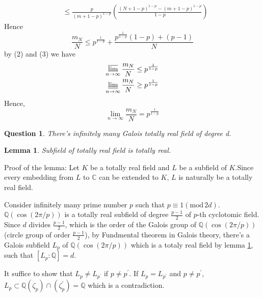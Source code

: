 \documentclass[a4paper,12pt]{article}
\newenvironment{prooff}{{\noindent\it\textcolor{cyan!40!black}{Proof}:}\quad}{\par}
\newcommand{\bb}[1]{\mathbb{#1}}
\newcommand{\p}{^{\prime}}
\renewcommand{\mod}[1]{(\text{mod}\,#1)}
\newtheorem{lem}[defn]{Lemma}
\newtheorem{ques}{Question}
\begin{document}
\begin{prooff}
\begin{align*}
          & \le \frac{p}{(m+1-p)^{1-p}}(\frac{(N+1-p)^{1-p}-(m+1-p)^{1-p}}{1-p})
    \end{align*}
    Hence
    \begin{equation}
        \frac{m_N}{N}\le p^{\frac{1}{1-p}}+\frac{p^{\frac{1}{1-p}}(1-p)+(p-1)}{N}
    \end{equation}
    by (2) and (3) we have
    \begin{align*}
        \varlimsup_{n\to \infty} \frac{m_N}{N}\le p^{\frac{1}{1-p}} \\
        \varliminf_{n\to \infty} \frac{m_N}{N}\ge p^{\frac{1}{1-p}}
    \end{align*}
    Hence,$$\lim_{n\to \infty}\frac{m_N}{N}=p^{\frac{1}{1-p}}$$

\end{prooff}
\begin{ques}
    There's infinitely many Galois totally real field of degree d.
\end{ques}
\begin{prooff}
    \begin{lem}
        \label{subfield}
        Subfield of totally real field is totally real.
    \end{lem}
    Proof of the lemma: Let $K$ be a totally real field and $L$ be a subfield of $K$.Since every embedding from $L$ to $\bb{C}$ can be extended to $K$, $L$ is naturally be a totally real field.

    Consider infinitely many prime number $p$ such that $p\equiv 1\mod{2d}$. $\bb{Q}(\cos(2\pi/p))$ is a totally real subfield of degree $\frac{p-1}{2}$ of $p$-th cyclotomic field. Since $d$ divides $\frac{p-1}{2}$, which is the order
    of the Galois group of $\bb{Q}(\cos(2\pi/p))$(circle group of order $\frac{p-1}{2}$), by Fundmental theorem in Galois theory, there's a Galois subfield $L_p$ of $\bb{Q}(\cos(2\pi/p))$ which is a totaly real field by lemma \ref*{subfield}, such that
    $[L_p:\bb{Q}]=d$.

    It suffice to show that $L_p\neq L_{p\p}$ if $p\neq p\p$. If $L_p=L_{p\p}$ and $p\neq p\p$, $L_p\subset \bb{Q}(\zeta_p)\cap (\zeta_p\p)=\bb{Q}$ which is a contradiction.
\end{prooff}
\end{document}
